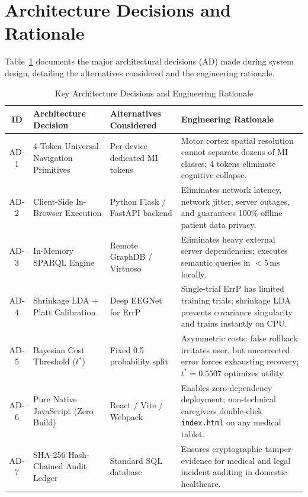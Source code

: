 \documentclass[12pt,a4paper]{report}
\begin{document}
\section{Architecture Decisions and Rationale}
Table~\ref{tab:ad} documents the major architectural decisions (AD) made during system design, detailing the alternatives considered and the engineering rationale.

\begin{table}[H]
\centering
\small
\caption{Key Architecture Decisions and Engineering Rationale}
\label{tab:ad}
\begin{tabularx}{\textwidth}{c p{3.6cm} p{3.2cm} X}
\toprule
\textbf{ID} & \textbf{Architecture Decision} & \textbf{Alternatives Considered} & \textbf{Engineering Rationale} \\
\midrule
AD-1 & 4-Token Universal Navigation Primitives & Per-device dedicated MI tokens & Motor cortex spatial resolution cannot separate dozens of MI classes; 4 tokens eliminate cognitive collapse. \\
\addlinespace
AD-2 & Client-Side In-Browser Execution & Python Flask / FastAPI backend & Eliminates network latency, network jitter, server outages, and guarantees 100\% offline patient data privacy. \\
\addlinespace
AD-3 & In-Memory SPARQL Engine & Remote GraphDB / Virtuoso & Eliminates heavy external server dependencies; executes semantic queries in $< 5$\,ms locally. \\
\addlinespace
AD-4 & Shrinkage LDA + Platt Calibration & Deep EEGNet for ErrP & Single-trial ErrP has limited training trials; shrinkage LDA prevents covariance singularity and trains instantly on CPU. \\
\addlinespace
AD-5 & Bayesian Cost Threshold ($t^*$) & Fixed 0.5 probability split & Asymmetric costs: false rollback irritates user, but uncorrected error forces exhausting recovery; $t^* = 0.5507$ optimizes utility. \\
\addlinespace
AD-6 & Pure Native JavaScript (Zero Build) & React / Vite / Webpack & Enables zero-dependency deployment; non-technical caregivers double-click \texttt{index.html} on any medical tablet. \\
\addlinespace
AD-7 & SHA-256 Hash-Chained Audit Ledger & Standard SQL database & Ensures cryptographic tamper-evidence for medical and legal incident auditing in domestic healthcare. \\
\bottomrule
\end{tabularx}
\end{table}
\end{document}
